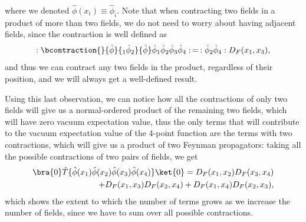 \begin{example}
\[\begin{aligned}
        \end{aligned}
    \]
    where we denoted \(\hat{\phi}(x_i) \equiv \hat{\phi}_i\). Note that when contracting two fields in a product of more than two fields, we do not need to worry about having adjacent fields, since the contraction is well defined as
    \[
        :\bcontraction{}{\hat{\phi}}{_1 \hat{\phi}_2}{\hat{\phi}} \hat{\phi}_1 \hat{\phi}_2 \hat{\phi}_3 \hat{\phi}_4 : \, = \, : \hat{\phi}_2 \hat{\phi}_4 : D_F (x_1,x_3),
    \]
    and thus we can contract any two fields in the product, regardless of their position, and we will always get a well-defined result.

    Using this last observation, we can notice how all the contractions of only two fields will give us a normal-ordered product of the remaining two fields, which will have zero vacuum expectation value, thus the only terms that will contribute to the vacuum expectation value of the 4-point function are the terms with two contractions, which will give us a product of two Feynman propagators: taking all the possible contractions of two pairs of fields, we get
    \[
        \begin{aligned}
            \bra{0} \hat{T} \{ \hat{\phi} (x_1) \hat{\phi} (x_2) \hat{\phi} (x_3) \hat{\phi} (x_4) \} \ket{0} = D_F (x_1,x_2) D_F (x_3,x_4) \\
            + D_F (x_1,x_3) D_F (x_2,x_4) + D_F (x_1,x_4) D_F (x_2,x_3),
        \end{aligned}
    \]
    which shows the extent to which the number of terms grows as we increase the number of fields, since we have to sum over all possible contractions.
\end{example}

